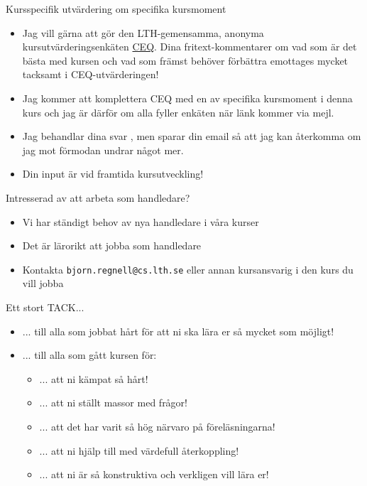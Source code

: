 \begin{Slide}{Kursspecifik utvärdering om specifika kursmoment}\SlideFontSmall
\begin{itemize}
\item Jag vill gärna att  gör den LTH-gemensamma, anonyma kursutvärderingsenkäten \href{https://www.ceq.lth.se/}{CEQ}. Dina fritext-kommentarer om vad som är det bästa med kursen och vad som främst behöver förbättra emottages mycket tacksamt i CEQ-utvärderingen!
\item Jag kommer att komplettera CEQ med en  av specifika kursmoment i denna kurs och jag är därför  om alla fyller enkäten när länk kommer via mejl.
\item Jag behandlar dina svar , men sparar din email så att jag kan återkomma om jag mot förmodan undrar något mer.
\item Din input är  vid framtida kursutveckling!
\end{itemize}
\end{Slide}

\begin{Slide}{Intresserad av att arbeta som handledare?}
\begin{itemize}
\item Vi har ständigt behov av nya handledare i våra kurser
\item Det är lärorikt att jobba som handledare
\item Kontakta \verb|bjorn.regnell@cs.lth.se| eller annan kursansvarig i den kurs du vill jobba
\end{itemize}

\end{Slide}


\begin{Slide}{Ett stort TACK...}
\begin{itemize}
  \item
... till alla  som jobbat hårt för att ni ska lära er så mycket som möjligt!
\item ... till alla  som gått kursen för:
\begin{itemize}
\item ... att ni kämpat så hårt!
\item ... att ni ställt massor med frågor!
\item ... att det har varit så hög närvaro på föreläsningarna!
\item ... att ni hjälp till med värdefull återkoppling!
\item ... att ni är så konstruktiva och verkligen vill lära er!
\end{itemize}
\vspace{2em} \pause

\end{itemize}
\end{Slide}

